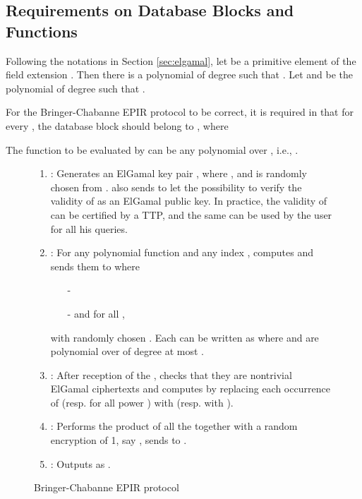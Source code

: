 \documentclass[JMC]{degruyter-journal}
\begin{document}
\subsection{Requirements on Database Blocks and Functions}\label{sec:input_domain}

Following the notations  in Section \ref{sec:elgamal}, let
 be a primitive element of the field extension .
Then there is a  polynomial  of degree  such that
 .
Let  and   be the polynomial of degree  such that
.

For the Bringer-Chabanne EPIR protocol   to be correct, it is
required
 in \cite{BC09} that
 for every , the database block  should belong to  , where

The function to be evaluated by  can be any polynomial
over , i.e., .




\begin{figure}[t]
\begin{center}
\begin{boxedminipage}{12cm}
\begin{enumerate}
\itemsep=-0.1cm
\item :
Generates an ElGamal key pair , where , and  is randomly chosen from .
 also sends  to let  the possibility
to verify the validity of  as an ElGamal public key. In
practice, the validity of  can be certified by a TTP, and the
same  can be used by the user for all his queries.



\item : For any polynomial function 
and any index , computes  and
sends them to  where
\begin{enumerate}
\item[-] 
\item[-] and  for all  ,
\end{enumerate}
with randomly chosen . Each  can be written as  where  and  are polynomial over 
of degree at most .
\item : After reception of the , checks that they are nontrivial
ElGamal ciphertexts and computes 
by replacing each occurrence of  (resp.  for
all power ) with  (resp. with ).
\item  : {Performs the product of all the  together with a random encryption
of 1, say , sends
 to .}
\item :  Outputs  as .
\end{enumerate}
\end{boxedminipage}
\end{center}
\caption{Bringer-Chabanne EPIR protocol}
\label{fig:EPIR}
\end{figure}
\end{document}
